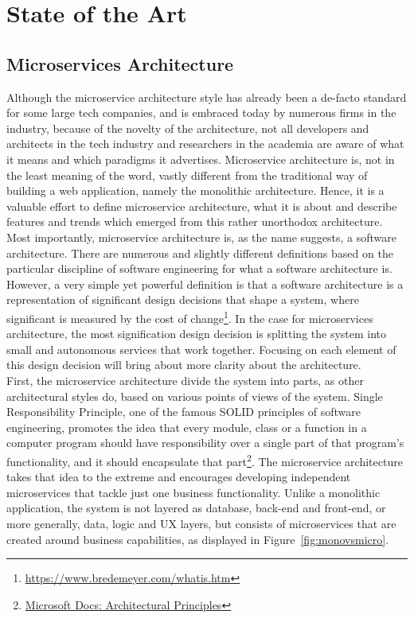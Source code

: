 \documentclass{Configuration_Files/PoliMi3i_thesis}
\begin{document}
\chapter{State of the Art}
\label{ch:art}%

\section{Microservices Architecture}
\label{sec:ms_arch}

Although the microservice architecture style has already been a de-facto standard for some large tech companies, and is embraced today by numerous firms in the industry, because of the novelty of the architecture, not all developers and architects in the tech industry and researchers in the academia are aware of what it means and which paradigms it advertises.
Microservice architecture is, not in the least meaning of the word, vastly different from the traditional way of building a web application, namely the monolithic architecture.
Hence, it is a valuable effort to define microservice architecture, what it is about and describe features and trends which emerged from this rather unorthodox architecture.
\\
Most importantly, microservice architecture is, as the name suggests, a software architecture.
There are numerous and slightly different definitions based on the particular discipline of software engineering for what a software architecture is.
However, a very simple yet powerful definition is that a software architecture is a representation of significant design decisions that shape a system, where significant is measured by the cost of change\footnote{\href{https://www.bredemeyer.com/whatis.htm}{https://www.bredemeyer.com/whatis.htm}}. 
In the case for microservices architecture, the most signification design decision is splitting the system into small and autonomous services that work together.
Focusing on each element of this design decision will bring about more clarity about the architecture.
\\
First, the microservice architecture divide the system into parts, as other architectural styles do, based on various points of views of the system.
Single Responsibility Principle, one of the famous SOLID principles of software engineering, promotes the idea that every module, class or a function in a computer program should have responsibility over a single part of that program's functionality, and it should encapsulate that part\footnote{\href{https://docs.microsoft.com/en-us/dotnet/architecture/modern-web-apps-azure/architectural-principles}{Microsoft Docs: Architectural Principles}}.
The microservice architecture takes that idea to the extreme and encourages developing independent microservices that tackle just one business functionality.
Unlike a monolithic application, the system is not layered as database, back-end and front-end, or more generally, data, logic and UX layers, but consists of microservices that are created around business capabilities, as displayed in Figure~\ref{fig:monovsmicro}.
\end{document}
